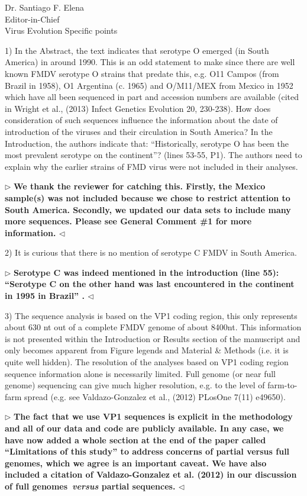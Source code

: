 \documentclass[12pt, a4paper]{letter} %
\newenvironment{reply}{$\triangleright$\bf}{$\triangleleft$}
\begin{document}
\begin{letter}{
	Dr. Santiago F. Elena\\
    Editor-in-Chief \\
    Virus Evolution
}
Specific points

1)      In the Abstract, the text indicates that serotype O emerged (in South America) in around 1990. 
This is an odd statement to make since there are well known FMDV serotype O strains that predate this, e.g. O11 Campos (from Brazil in 1958), O1 Argentina (c. 1965) and O/M11/MEX from Mexico in 1952 which have all been sequenced in part and accession numbers are available (cited in Wright et al., (2013) Infect Genetics Evolution 20, 230-238).  
How does consideration of such sequences influence the information about the date of introduction of the viruses and their circulation in South America? 
In the Introduction, the authors indicate that: ``Historically, serotype O has been the most prevalent serotype on the continent''? (lines 53-55, P1). 
The authors need to explain why the earlier strains of FMD virus were not included in their analyses.

\begin{reply}
We thank the reviewer for catching this.
Firstly, the Mexico sample(s) was not included because we chose to restrict attention to South America.
Secondly, we updated our data sets to include many more sequences.
Please see General Comment \#1 for more information.
\end{reply}

2)      It is curious that there is no mention of serotype C FMDV in South America.

\begin{reply}
Serotype C was indeed mentioned in the introduction (line 55): ``Serotype C on the other hand was last encountered in the continent in 1995 in Brazil'' .
\end{reply}

3)      The sequence analysis is based on the VP1 coding region, this only represents about 630 nt out of a complete FMDV genome of about 8400nt. 
This information is not presented within the Introduction or Results section of the manuscript and only becomes apparent from Figure legends and Material \& Methods (i.e. it is quite well hidden). 
The resolution of the analyses based on VP1 coding region sequence information alone is necessarily limited. 
Full genome (or near full genome) sequencing can give much higher resolution, e.g. to the level of farm-to-farm spread (e.g. see Valdazo-Gonzalez et al., (2012) PLosOne 7(11) e49650).

\begin{reply}
The fact that we use VP1 sequences is explicit in the methodology and all of our data and code are publicly available.
In any case, we have now added a whole section at the end of the paper called ``Limitations of this study'' to address concerns of partial versus full genomes, which we agree is an important caveat.
We have also included a citation of Valdazo-Gonzalez et al. (2012) in our discussion of full genomes~\textit{versus} partial sequences.
\end{reply}


\end{letter}
\end{document}
